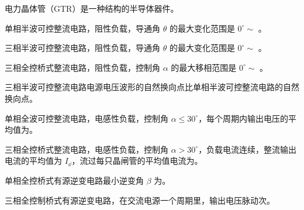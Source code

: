 \documentclass[电力电子]{subfiles}
\begin{document}
\begin{ti}
	电力晶体管（GTR）是一种结构的半导体器件。
\end{ti}

\begin{ti}
	单相半波可控整流电路，阻性负载，导通角 $\theta$ 的最大变化范围是 $0^\circ \sim $ 。
\end{ti}

\begin{ti}
	三相半波可控整流电路，阻性负载，导通角 $\theta$ 的最大变化范围是 $0^\circ \sim $ 。
\end{ti}

\begin{ti}
	三相全控桥式整流电路，阻性负载，控制角 $\alpha$ 的最大移相范围是 $0^\circ \sim $ 。
\end{ti}

\begin{ti}
	三相半波可控整流电路电源电压波形的自然换向点比单相半波可控整流电路的自然换向点。
\end{ti}

\begin{ti}
	单相全波可控整流电路，电感性负载，控制角 $\alpha \leq 30^\circ$，每个周期内输出电压的平均值为。
\end{ti}

\begin{ti}
	三相全控桥式整流电路，电感性负载，控制角 $\alpha > 30^\circ$，负载电流连续，整流输出电流的平均值为 $I_{\dd}$，流过每只晶闸管的平均值电流为。
\end{ti}

\begin{ti}
	单相全控桥式有源逆变电路最小逆变角 $\beta$ 为。
\end{ti}

\begin{ti}
	三相全控制桥式有源逆变电路，在交流电源一个周期里，输出电压脉动次。
\end{ti}
\end{document}
